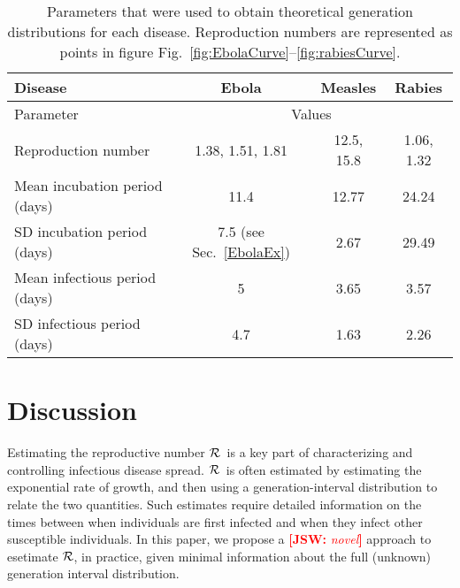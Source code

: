 \documentclass[12pt,]{article}
\newcommand{\RR}{\ensuremath{{\cal R}}}
\newcommand{\sref}[1]{Sec.~\ref{#1}}
\newcommand{\frange}[2]{Fig.~\ref{fig:#1}--\ref{fig:#2}}
\newcommand{\tlab}[1]{\label{tab:#1}}
\newcommand{\comment}[3]{\textcolor{#1}{\textbf{[#2: }\textit{#3}\textbf{]}}}
\newcommand{\jsw}[1]{\comment{red}{JSW}{#1}}
\begin{document}
\begin{table}[h!]
\centering
\begin{tabular}{l*{3}{c}}
\hline
Disease & Ebola & Measles & Rabies\\
\hline
Parameter & \multicolumn{3}{c}{Values}\\
\hline
Reproduction number & 1.38, 1.51, 1.81 \cite{AylwBarb14} & 12.5, 15.8 \cite{AndeMay82} & 1.06, 1.32 \cite{HampDush09} \\
Mean incubation period (days) & 11.4 \cite{AylwBarb14} & 12.77 \cite{LessReic09}  & 24.24 \cite{HampDush09} \\
SD incubation period (days) & 7.5 (see \sref{EbolaEx}) & 2.67 \cite{LessReic09} & 29.49 \cite{HampDush09} \\
Mean infectious period (days) & 5 \cite{AylwBarb14} & 3.65 \cite{Lloy01} & 3.57 \cite{HampDush09} \\
SD infectious period (days) & 4.7 \cite{AylwBarb14} & 1.63 \cite{Lloy01} & 2.26 \cite{HampDush09}
\end{tabular}
\caption{Parameters that were used to obtain theoretical generation distributions for each disease. Reproduction numbers are represented as points in figure \frange{EbolaCurve}{rabiesCurve}.}
\tlab{parameters}
\end{table}

\section{Discussion}

Estimating the reproductive number \RR\ is a key part of characterizing and controlling infectious disease spread. \RR\ is often estimated by estimating the exponential rate of growth, and then using a generation-interval distribution to relate the two quantities. 
Such estimates require detailed information on the times between when individuals are first infected and when they infect other susceptible individuals. 
In this paper, we propose a \jsw{novel} approach to esetimate \RR, in practice, given minimal information about the full (unknown) generation interval distribution.
\end{document}
